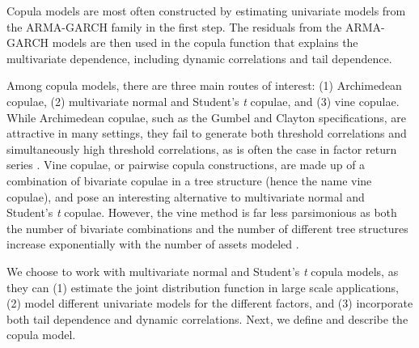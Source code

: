 Copula models are most often constructed by estimating univariate models from the ARMA-GARCH family in the first step. The residuals from the ARMA-GARCH models are then used in the copula function that explains the multivariate dependence, including dynamic correlations and tail dependence.

Among copula models, there are three main routes of interest: (1) Archimedean copulae, (2) multivariate normal and Student's \textit{t} copulae, and (3) vine copulae. While Archimedean copulae, such as the Gumbel and Clayton specifications, are attractive in many settings, they fail to generate both threshold correlations and simultaneously high threshold correlations, as is often the case in factor return series \textcite{ChristoffersenLanglois2013}. Vine copulae, or pairwise copula constructions, are made up of a combination of bivariate copulae in a tree structure (hence the name vine copulae), and pose an interesting alternative to multivariate normal and Student's \textit{t} copulae. However, the vine method is far less parsimonious as both the number of bivariate combinations and the number of different tree structures increase exponentially with the number of assets modeled \autocite{Aas2009}.

We choose to work with multivariate normal and Student's \textit{t} copula models, as they can (1) estimate the joint distribution function in large scale applications, (2) model different univariate models for the different factors, and (3) incorporate both tail dependence and dynamic correlations. Next, we define and describe the copula model.
